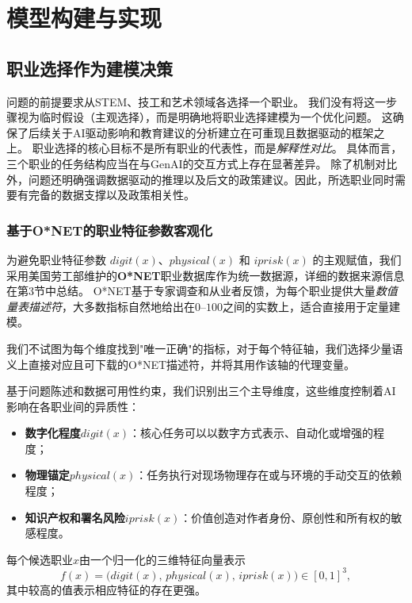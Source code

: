 \section{模型构建与实现}

\subsection{职业选择作为建模决策}

问题的前提要求从STEM、技工和艺术领域各选择一个职业。
我们没有将这一步骤视为临时假设（主观选择），而是明确地将职业选择建模为一个优化问题。
这确保了后续关于AI驱动影响和教育建议的分析建立在可重现且数据驱动的框架之上。
职业选择的核心目标不是所有职业的代表性，而是\emph{解释性对比}。
具体而言，三个职业的任务结构应当在与GenAI的交互方式上存在显著差异。
除了机制对比外，问题还明确强调数据驱动的推理以及后文的政策建议。因此，所选职业同时需要有完备的数据支撑以及政策相关性。

\subsubsection{基于O*NET的职业特征参数客观化}

为避免职业特征参数 $\textit{digit}(x)$、$\textit{physical}(x)$ 和 $\textit{iprisk}(x)$ 的主观赋值，我们采用美国劳工部维护的\textbf{O*NET}职业数据库作为统一数据源，详细的数据来源信息在第3节中总结。
O*NET基于专家调查和从业者反馈，为每个职业提供大量\emph{数值量表描述符}，大多数指标自然地给出在$0$--$100$之间的实数上，适合直接用于定量建模。

我们不试图为每个维度找到"唯一正确"的指标，对于每个特征轴，我们选择少量语义上直接对应且可下载的O*NET描述符，并将其用作该轴的代理变量。

基于问题陈述和数据可用性约束，我们识别出三个主导维度，这些维度控制着AI影响在各职业间的异质性：
\begin{itemize}
    \item \textbf{数字化程度$digit(x)$}：核心任务可以以数字方式表示、自动化或增强的程度；
    \item \textbf{物理锚定$physical(x)$}：任务执行对现场物理存在或与环境的手动交互的依赖程度；
    \item \textbf{知识产权和署名风险$iprisk(x)$}：价值创造对作者身份、原创性和所有权的敏感程度。
\end{itemize}

每个候选职业$x$由一个归一化的三维特征向量表示
\begin{equation}
    f(x)=\big(digit(x),\,physical(x),\,iprisk(x)\big)\in[0,1]^3,
\end{equation}
其中较高的值表示相应特征的存在更强。

